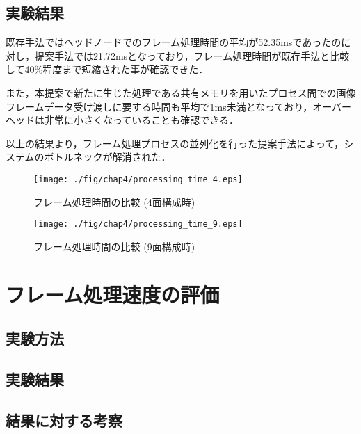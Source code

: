 \subsection{実験結果}

既存手法ではヘッドノードでのフレーム処理時間の平均が52.35msであったのに対し，提案手法では21.72msとなっており，フレーム処理時間が既存手法と比較して40\%程度まで短縮された事が確認できた．

また，本提案で新たに生じた処理である共有メモリを用いたプロセス間での画像フレームデータ受け渡しに要する時間も平均で1ms未満となっており，オーバーヘッドは非常に小さくなっていることも確認できる．

以上の結果より，フレーム処理プロセスの並列化を行った提案手法によって，システムのボトルネックが解消された．

\begin{figure}[H]
    \hspace*{\fill}
    \texttt{[image: ./fig/chap4/processing\_time\_4.eps]}
    \hspace*{\fill}
    \caption{フレーム処理時間の比較 (4面構成時)}
\end{figure}

\begin{figure}[H]
    \hspace*{\fill}
    \texttt{[image: ./fig/chap4/processing\_time\_9.eps]}
    \hspace*{\fill}
    \caption{フレーム処理時間の比較 (9面構成時)}
\end{figure}

\section{フレーム処理速度の評価}



\subsection{実験方法}

\subsection{実験結果}

\subsection{結果に対する考察}